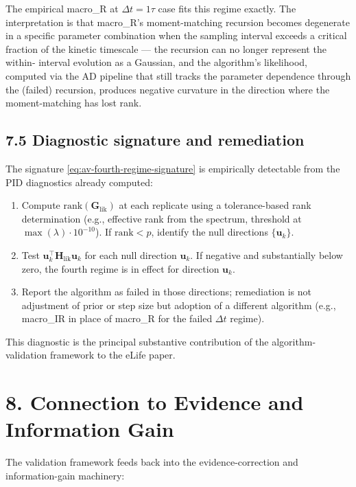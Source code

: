 \documentclass[11pt]{article}
\begin{document}
The empirical macro\_R at $\Delta t = 1\tau$ case fits this regime
exactly. The interpretation is that macro\_R's moment-matching
recursion becomes degenerate in a specific parameter combination when
the sampling interval exceeds a critical fraction of the kinetic
timescale --- the recursion can no longer represent the within-
interval evolution as a Gaussian, and the algorithm's likelihood,
computed via the AD pipeline that still tracks the parameter
dependence through the (failed) recursion, produces negative curvature
in the direction where the moment-matching has lost rank.

\subsection*{7.5 Diagnostic signature and remediation}

The signature \eqref{eq:av-fourth-regime-signature} is empirically
detectable from the PID diagnostics already computed:

\begin{enumerate}
\item Compute $\mathrm{rank}(\mathbf G_{\mathrm{lik}})$ at each
  replicate using a tolerance-based rank determination (e.g.,
  effective rank from the spectrum, threshold at
  $\max(\lambda) \cdot 10^{-10}$). If $\mathrm{rank} < p$, identify
  the null directions $\{\mathbf u_k\}$.
\item Test $\mathbf u_k^\top \mathbf H_{\mathrm{lik}} \mathbf u_k$ for
  each null direction $\mathbf u_k$. If negative and substantially
  below zero, the fourth regime is in effect for direction $\mathbf u_k$.
\item Report the algorithm as failed in those directions; remediation
  is not adjustment of prior or step size but adoption of a different
  algorithm (e.g., macro\_IR in place of macro\_R for the failed
  $\Delta t$ regime).
\end{enumerate}

This diagnostic is the principal substantive contribution of the
algorithm-validation framework to the eLife paper.

\section*{8. Connection to Evidence and Information Gain}
\label{sec:av-connection-evidence}

The validation framework feeds back into the evidence-correction and
information-gain machinery:
\end{document}
